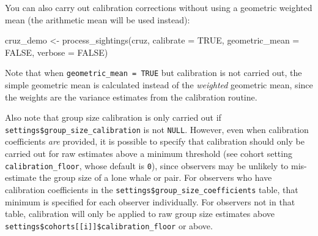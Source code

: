 \documentclass[
]{book}
\newenvironment{Shaded}{\begin{snugshade}}{\end{snugshade}}
\newcommand{\AttributeTok}[1]{\textcolor[rgb]{0.77,0.63,0.00}{#1}}
\newcommand{\ConstantTok}[1]{\textcolor[rgb]{0.00,0.00,0.00}{#1}}
\newcommand{\DecValTok}[1]{\textcolor[rgb]{0.00,0.00,0.81}{#1}}
\newcommand{\FloatTok}[1]{\textcolor[rgb]{0.00,0.00,0.81}{#1}}
\newcommand{\FunctionTok}[1]{\textcolor[rgb]{0.00,0.00,0.00}{#1}}
\newcommand{\NormalTok}[1]{#1}
\newcommand{\OtherTok}[1]{\textcolor[rgb]{0.56,0.35,0.01}{#1}}
\newcommand{\SpecialCharTok}[1]{\textcolor[rgb]{0.00,0.00,0.00}{#1}}
\begin{document}
You can also carry out calibration corrections without using a geometric weighted mean (the arithmetic mean will be used instead):

\begin{Shaded}
\begin{Highlighting}[]
\NormalTok{cruz\_demo }\OtherTok{\textless{}{-}} \FunctionTok{process\_sightings}\NormalTok{(cruz, }
                               \AttributeTok{calibrate =} \ConstantTok{TRUE}\NormalTok{,}
                               \AttributeTok{geometric\_mean =} \ConstantTok{FALSE}\NormalTok{,}
                               \AttributeTok{verbose =} \ConstantTok{FALSE}\NormalTok{)}
\end{Highlighting}
\end{Shaded}

\begin{Shaded}
\end{Shaded}

Note that when \texttt{geometric\_mean\ =\ TRUE} but calibration is not carried out, the simple geometric mean is calculated instead of the \emph{weighted} geometric mean, since the weights are the variance estimates from the calibration routine.

Also note that group size calibration is only carried out if \texttt{settings\$group\_size\_calibration} is not \texttt{NULL}. However, even when calibration coefficients \emph{are} provided, it is possible to specify that calibration should only be carried out for raw estimates above a minimum threshold (see cohort setting \texttt{calibration\_floor}, whose default is \texttt{0}), since observers may be unlikely to mis-estimate the group size of a lone whale or pair. For observers who have calibration coefficients in the \texttt{settings\$group\_size\_coefficients} table, that minimum is specified for each observer individually. For observers not in that table, calibration will only be applied to raw group size estimates above \texttt{settings\$cohorts{[}{[}i{]}{]}\$calibration\_floor} or above.
\end{document}
